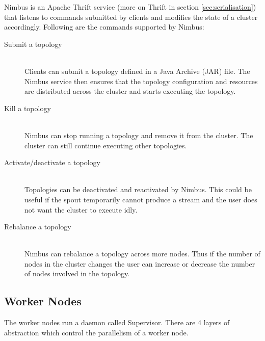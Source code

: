 \documentclass[bsc,logo,frontabs,twoside,singlespacing,normalheadings,parskip]{infthesis}\usepackage[]{graphicx}\usepackage[]{color}
\begin{document}
Nimbus is an Apache Thrift \cite{ApacheThrift} service (more on Thrift in section \ref{sec:serialisation}) that listens to commands submitted by clients and modifies the state of a cluster accordingly. Following are the commands supported by Nimbus:

\begin{description}
	\item[Submit a topology] \hfill \\
	Clients can submit a topology defined in a Java Archive (JAR) file. The Nimbus service then ensures that the topology configuration and resources are distributed across the cluster and starts executing the topology.
	\item[Kill a topology] \hfill \\
	Nimbus can stop running a topology and remove it from the cluster. The cluster can still continue executing other topologies.
	\item[Activate/deactivate a topology] \hfill \\
	Topologies can be deactivated and reactivated by Nimbus. This could be useful if the spout temporarily cannot produce a stream and the user does not want the cluster to execute idly.
	\item[Rebalance a topology] \hfill \\
	Nimbus can rebalance a topology across more nodes. Thus if the number of nodes in the cluster changes the user can increase or decrease the number of nodes involved in the topology.
\end{description}


\subsection{Worker Nodes}

The worker nodes run a daemon called Supervisor. There are 4 layers of abstraction which control the parallelism of a worker node.
\end{document}
